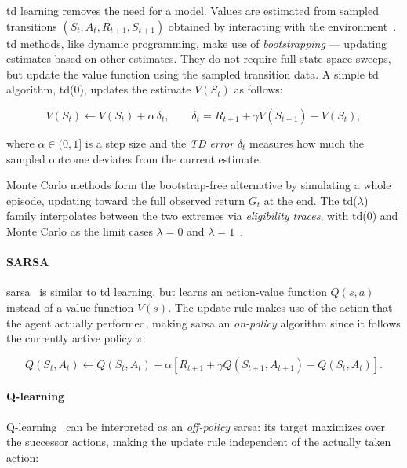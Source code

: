 \Gls{td} learning removes the need for a model.
Values are estimated from sampled transitions $(S_t,A_t,R_{t+1},S_{t+1})$ obtained by interacting with the environment~\cite{sutton_learning_1988,sutton_reinforcement_2020}.
\Gls{td} methods, like dynamic programming, make use of \emph{bootstrapping} --- updating estimates based on other estimates.
They do not require full state-space sweeps, but update the value function using the sampled transition data.
A simple \gls{td} algorithm, \gls{td}(0), updates the estimate $V(S_t)$ as follows:

\begin{equation}\label{eq:td0}
  V(S_t)\leftarrow V(S_t)+\alpha\,\delta_t,
  \qquad
  \delta_t=R_{t+1}+\gamma V(S_{t+1})-V(S_t),
\end{equation}

where $\alpha\in(0,1]$ is a step size and the \emph{TD error} $\delta_t$ measures how much the
sampled outcome deviates from the current estimate.

Monte Carlo methods form the bootstrap-free alternative by simulating a whole
episode, updating toward the full observed return $G_t$ at the end.
The \gls{td}($\lambda$) family interpolates between the two extremes via \emph{eligibility traces},
with \gls{td}(0) and Monte Carlo as the limit cases $\lambda=0$ and
$\lambda=1$~\cite{sutton_learning_1988}.

\paragraph{SARSA}
\Gls{sarsa}~\cite{sutton_reinforcement_2020} is similar to \gls{td} learning, but learns an action-value function $Q(s,a)$ instead of
a value function $V(s)$. The update rule makes use of the action that the agent
actually performed, making \gls{sarsa} an \emph{on-policy} algorithm since it follows
the currently active policy $\pi$:

\begin{equation}\label{eq:sarsa}
  Q(S_t,A_t)\leftarrow Q(S_t,A_t)+\alpha\left[R_{t+1}+\gamma Q(S_{t+1},A_{t+1})-Q(S_t,A_t)\right].
\end{equation}

\paragraph{Q-learning}
Q-learning~\cite{watkins_q-learning_1992} can be interpreted as an \emph{off-policy} \gls{sarsa}:
its target maximizes over the successor actions, making the update rule
independent of the actually taken action:

